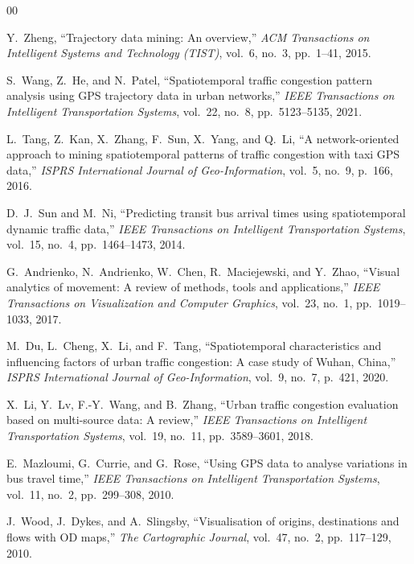 \documentclass[conference]{IEEEtran}
\begin{document}
\begin{thebibliography}{00}

Y.~Zheng, ``Trajectory data mining: An overview,'' \emph{ACM Transactions on Intelligent Systems and Technology (TIST)}, vol.~6, no.~3, pp.~1--41, 2015.

S.~Wang, Z.~He, and N.~Patel, ``Spatiotemporal traffic congestion pattern analysis using GPS trajectory data in urban networks,'' \emph{IEEE Transactions on Intelligent Transportation Systems}, vol.~22, no.~8, pp.~5123--5135, 2021.

L.~Tang, Z.~Kan, X.~Zhang, F.~Sun, X.~Yang, and Q.~Li, ``A network-oriented approach to mining spatiotemporal patterns of traffic congestion with taxi GPS data,'' \emph{ISPRS International Journal of Geo-Information}, vol.~5, no.~9, p.~166, 2016.

D.~J.~Sun and M.~Ni, ``Predicting transit bus arrival times using spatiotemporal dynamic traffic data,'' \emph{IEEE Transactions on Intelligent Transportation Systems}, vol.~15, no.~4, pp.~1464--1473, 2014.

G.~Andrienko, N.~Andrienko, W.~Chen, R.~Maciejewski, and Y.~Zhao, ``Visual analytics of movement: A review of methods, tools and applications,'' \emph{IEEE Transactions on Visualization and Computer Graphics}, vol.~23, no.~1, pp.~1019--1033, 2017.

M.~Du, L.~Cheng, X.~Li, and F.~Tang, ``Spatiotemporal characteristics and influencing factors of urban traffic congestion: A case study of Wuhan, China,'' \emph{ISPRS International Journal of Geo-Information}, vol.~9, no.~7, p.~421, 2020.

X.~Li, Y.~Lv, F.-Y.~Wang, and B.~Zhang, ``Urban traffic congestion evaluation based on multi-source data: A review,'' \emph{IEEE Transactions on Intelligent Transportation Systems}, vol.~19, no.~11, pp.~3589--3601, 2018.

E.~Mazloumi, G.~Currie, and G.~Rose, ``Using GPS data to analyse variations in bus travel time,'' \emph{IEEE Transactions on Intelligent Transportation Systems}, vol.~11, no.~2, pp.~299--308, 2010.

J.~Wood, J.~Dykes, and A.~Slingsby, ``Visualisation of origins, destinations and flows with OD maps,'' \emph{The Cartographic Journal}, vol.~47, no.~2, pp.~117--129, 2010.


\end{thebibliography}
\end{document}
